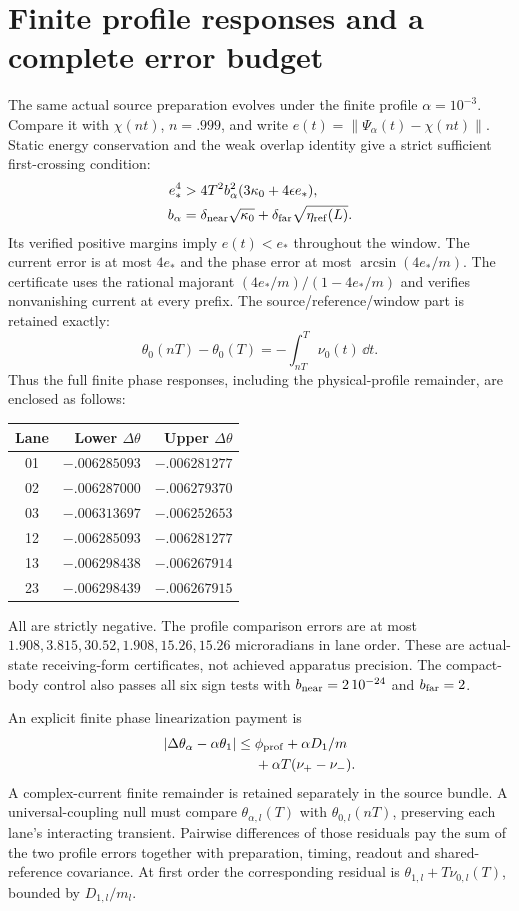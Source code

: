 \section{Finite profile responses and a complete error budget}
The same actual source preparation evolves under the finite profile
$\alpha=10^{-3}$. Compare it with $\chi(nt)$, $n=.999$, and write
$e(t)=\|\Psi_\alpha(t)-\chi(nt)\|$. Static energy conservation and the
weak overlap identity give a strict sufficient first-crossing condition:
\[
 \begin{aligned}
 e_*^4>{}&4T^2 b_\alpha^2(3\kappa_0+4\epsilon e_*),\\
 b_\alpha={}&\delta_{\rm near}\sqrt{\kappa_0}
                 +\delta_{\rm far}\sqrt{\eta_{\rm ref}(L)}.
 \end{aligned}
\]
Its verified positive margins imply $e(t)<e_*$ throughout the window.
The current error is at most $4e_*$ and the phase error at most
$\arcsin(4e_*/m)$. The certificate uses the rational majorant
$(4e_*/m)/(1-4e_*/m)$ and verifies nonvanishing current at every prefix.
The source/reference/window part is retained exactly:
\[
 \theta_0(nT)-\theta_0(T)=-\int_{nT}^{T}\nu_0(t)\,\dd t.
\]
Thus the full finite phase responses, including the physical-profile
remainder, are enclosed as follows:
\begin{center}\small
\begin{tabular}{c rr}\toprule
Lane&Lower $\Delta\theta$&Upper $\Delta\theta$\\\midrule
01&$-.006285093$&$-.006281277$\\
02&$-.006287000$&$-.006279370$\\
03&$-.006313697$&$-.006252653$\\
12&$-.006285093$&$-.006281277$\\
13&$-.006298438$&$-.006267914$\\
23&$-.006298439$&$-.006267915$\\\bottomrule
\end{tabular}
\end{center}
All are strictly negative. The profile comparison errors are at most
$1.908,3.815,30.52,1.908,15.26,15.26$ microradians in lane order.
These are actual-state receiving-form certificates, not achieved apparatus
precision. The compact-body control also passes all six sign tests with
$b_{\rm near}=2\,10^{-24}$ and $b_{\rm far}=2$.

An explicit finite phase linearization payment is
\[
 \begin{aligned}
 |\Delta\theta_\alpha-\alpha\theta_1|\le{}&
  \phi_{\rm prof}+\alpha D_1/m\\
  &+\alpha T(\nu_+-\nu_-).
 \end{aligned}
\]
A complex-current finite remainder is retained separately in the source
bundle. A universal-coupling null must compare
$\theta_{\alpha,l}(T)$ with $\theta_{0,l}(nT)$, preserving each lane's
interacting transient. Pairwise differences of those residuals pay the sum
of the two profile errors together with preparation, timing, readout and
shared-reference covariance. At first order the corresponding residual is
$\theta_{1,l}+T\nu_{0,l}(T)$, bounded by $D_{1,l}/m_l$.

